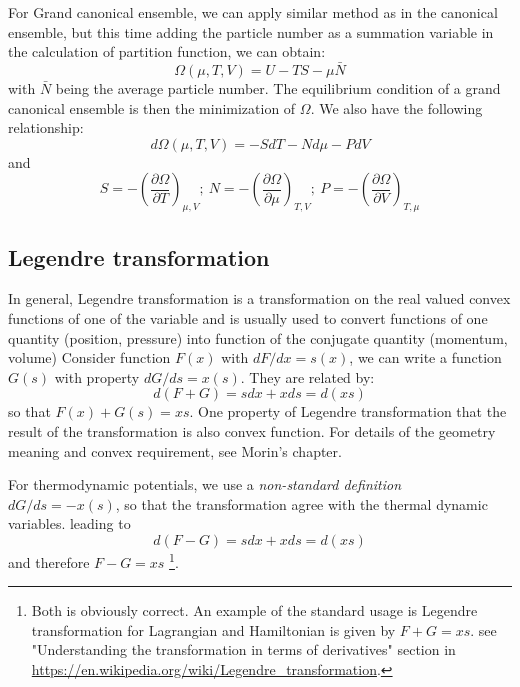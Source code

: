 \documentclass{article}
\begin{document}
For Grand canonical ensemble, we can apply similar method as in the canonical ensemble, but 
this time adding the particle number as a summation variable in the calculation of 
partition function, we can obtain:
\begin{equation}
    \Omega(\mu,T,V) = U - TS - \mu \bar{N}
\end{equation}
with $\bar{N}$ being the average particle number. The equilibrium 
condition of a grand canonical ensemble is then the minimization of $\Omega$. 
We also have the following relationship:
\begin{equation}
    d\Omega(\mu,T,V) = -SdT - Nd\mu - PdV
\end{equation}
and
\begin{equation}
    S = -\left(\frac{\partial \Omega}{\partial T}\right)_{\mu,V};\  
    N = -\left(\frac{\partial \Omega}{\partial \mu}\right)_{T,V};\ 
    P = -\left(\frac{\partial \Omega}{\partial V}\right)_{T,\mu}
\end{equation}

\subsection*{Legendre transformation}
In general, Legendre transformation is a transformation on the real valued convex functions
of one of the variable and is usually used to convert functions of one quantity (position, pressure) into function of
the conjugate quantity (momentum, volume)
Consider function $F(x)$ with $dF/dx = s(x)$, we can write a function
$G(s)$ with property $dG/ds = x(s)$. They are related by:
\begin{equation}
    d(F+G) = sdx + xds = d(xs)
\end{equation}
so that $F(x) + G(s) = xs$. One property of Legendre transformation that the result of the transformation 
is also convex function. For details of the geometry meaning and convex requirement, see Morin's chapter.

For thermodynamic potentials, we use a \emph{non-standard definition} $dG/ds = -x(s)$, 
so that the transformation agree with the thermal dynamic variables.
leading to 
\begin{equation}
    d(F-G) = sdx + xds = d(xs)
\end{equation}
and therefore $F-G = xs$
\footnote{
    Both is obviously correct. An example of the standard usage is Legendre transformation 
    for Lagrangian and Hamiltonian is given by $F+G = xs$. see "Understanding the transformation in terms of derivatives"
    section in \url{https://en.wikipedia.org/wiki/Legendre_transformation}.
}.
\end{document}

